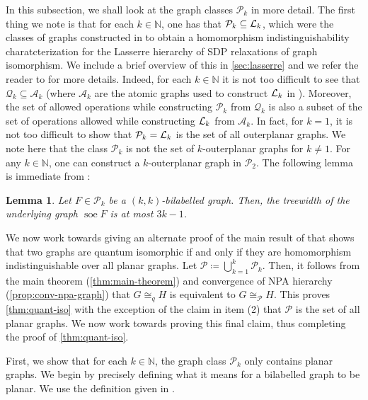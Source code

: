 \documentclass[11pt,a4paper]{article}
\theoremstyle{plain}
\newtheorem{lem}[thm]{Lemma}
\theoremstyle{remark}
\theoremstyle{definition}
\DeclareMathOperator{\soe}{soe}
\def\calA{{\mathcal A}} \def\calB{{\mathcal B}} \def\calC{{\mathcal C}}
\def\calP{{\mathcal P}} \def\calQ{{\mathcal Q}} \def\calR{{\mathcal R}}
\begin{document}
In this subsection, we shall look at the graph classes $\calP_k$ in more detail. The first thing we note is that for each $k \in \mathbb{N}$, one has that $\calP_k \subseteq \calL_k$, which were the classes of graphs constructed in \cite{roberson-seppelt-arxiv} to obtain a homomorphism indistinguishability charatcterization for the Lasserre hierarchy of SDP relaxations of graph isomorphism. We include a brief overview of this in \cref{sec:lasserre} and we refer the reader to \cite{roberson-seppelt-arxiv} for more details. Indeed, for each $k \in \mathbb{N}$ it is not too difficult to see that $\calQ_k \subseteq \calA_k$ (where $\calA_k$ are the atomic graphs used to construct ${\mathcal L}_k$ in \cite{roberson-seppelt-arxiv}). Moreover, the set of allowed operations while constructing $\calP_k$ from $\calQ_k$ is also a subset of the set of operations allowed while constructing ${\mathcal L}_k$ from $\calA_k$. In fact, for $k = 1$, it is not too difficult to show that $\calP_k = \calL_k$ is the set of all outerplanar graphs. We note here that the class $\calP_k$ is not the set of $k$-outerplanar graphs for $k \neq 1$. For any $k \in \mathbb{N}$, one can construct a $k$-outerplanar graph in $\calP_2$. The following lemma is immediate from \cite[Lemma~4.7]{roberson-seppelt-arxiv}:

\begin{lem}\label{lem:bounded-tw}
    Let $F \in \calP_k$ be a $(k,k)$-bilabelled graph. Then, the treewidth of the underlying graph $\soe F$ is at most $3k -1$. 
\end{lem}

We now work towards giving an alternate proof of the main result of \cite{david-laura} that shows that two graphs are quantum isomorphic if and only if they are homomorphism indistinguishable over all planar graphs. Let $\mathcal{P} \coloneqq \bigcup_{k=1}^k \calP_k$. Then, it follows from the main theorem (\cref{thm:main-theorem}) and convergence of NPA hierarchy (\cref{prop:conv-npa-graph}) that $G \cong_q H$ is equivalent to $G \cong_{\calP} H$. This proves \cref{thm:quant-iso} with the exception of the claim in item (2) that $\calP$ is the set of all planar graphs. We now work towards proving this final claim, thus completing the proof of \cref{thm:quant-iso}.  

First, we show that for each $k \in \mathbb{N}$, the graph class $\calP_k$ only contains planar graphs. We begin by precisely defining what it means for a bilabelled graph to be planar. We use the definition given in \cite{david-laura}. 
\end{document}
